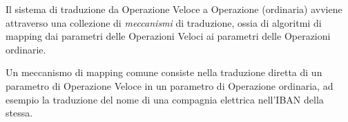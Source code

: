 Il sistema di traduzione da Operazione Veloce a Operazione (ordinaria) avviene attraverso una collezione di \emph{meccanismi} di traduzione, ossia di algoritmi di mapping dai parametri delle Operazioni Veloci ai parametri delle Operazioni ordinarie.

Un meccanismo di mapping comune consiste nella traduzione diretta di un parametro di Operazione Veloce in un parametro di Operazione ordinaria, ad esempio la traduzione del nome di una compagnia elettrica nell'IBAN della stessa.
